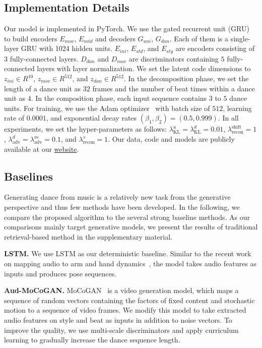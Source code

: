 \documentclass{article}
\newcommand{\tb}[1]{\textbf{#1}}
\newlength\secmargin
\newlength\subsecmargin
\begin{document}
\subsection{Implementation Details}
\label{subsec:implement}
Our model is implemented in PyTorch. 
We use the gated recurrent unit (GRU) to build encoders $E_{mov}$, $E_{mtd}$ and decoders $G_{uni}$, $G_{dan}$. 
Each of them is a single-layer GRU with 1024 hidden units. 
$E_{ini}$, $E_{std}$, and $E_{sty}$ are encoders consisting of $3$ fully-connected layers.
$D_{dan}$ and $D_{mov}$ are discriminators containing $5$ fully-connected layers with layer normalization.
We set the latent code dimensions to $z_{ini}\in R^{10}$, $z_{mov}\in R^{512}$, and $z_{dan}\in R^{512}$. 
In the decomposition phase, we set the length of a dance unit as $32$ frames and the number of beat times within a dance unit as $4$. 
In the composition phase, each input sequence contains $3$ to $5$ dance units.
For training, we use the Adam optimizer~\cite{adam} with batch size of $512$, learning rate of $0.0001$, and exponential decay rates $(\beta_1, \beta_2) = (0.5, 0.999)$. 
In all experiments, we set the hyper-parameters as follows: $\lambda^u_{\mathrm{KL}}=\lambda^d_{\mathrm{KL}}=0.01$, $ \lambda_{\mathrm{recon}}^{\mathrm{shift}}=1$, $\lambda^d_{\mathrm{adv}}=\lambda^m_{\mathrm{adv}}=0.1$, and $\lambda^s_{\mathrm{recon}}=1$. 
Our data, code and models are publicly available at our \href{https://github.com/NVlabs/Dance2Music}{website}.

\vspace{\subsecmargin}
\subsection{Baselines}
\vspace{\subsecmargin}
Generating dance from music is a relatively new task from the generative perspective and thus few methods have been developed. 
In the following, we compare the proposed algorithm to the several strong baseline methods. 
As our comparisons mainly target generative models, we present the results of traditional retrieval-based method in the supplementary material.


\tb{LSTM.} We use LSTM as our deterministic baseline. 
Similar to the recent work on mapping audio to arm and hand dynamics~\cite{shlizerman2017audio}, the model takes audio features as inputs and produces pose sequences.

\tb{Aud-MoCoGAN.}
MoCoGAN~\cite{tulyakov2017mocogan} is a video generation model, which maps a sequence of random vectors containing the factors of fixed content and stochastic motion to a sequence of video frames. 
We modify this model to take extracted audio features on style and beat as inputs in addition to noise vectors.
To improve the quality, we use multi-scale discriminators and apply curriculum learning to gradually increase the dance sequence length.
\end{document}
